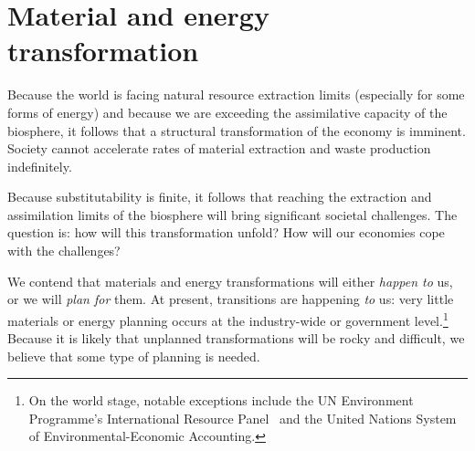 \section{Material and energy transformation}

Because the world is facing natural resource extraction limits
(especially for some forms of energy)
and because we are exceeding the assimilative capacity of the biosphere,
it follows that a structural transformation of the economy is imminent.
Society cannot accelerate rates of material extraction
and waste production indefinitely.

Because substitutability is finite, 
it follows that reaching the extraction and assimilation limits 
of the biosphere will bring significant societal challenges.
The question is: how will this transformation unfold?
How will our economies cope with the challenges?

We contend that materials and energy transformations will either  
\emph{happen to} us, or we will \emph{plan for} them.
At present,
transitions are happening \emph{to} us:
very little materials or energy planning occurs
at the industry-wide or government level.\footnote{On the world stage, 
	notable exceptions include the UN Environment Programme's 
	International Resource Panel~\cite{UNEP-IRP:aa}
	and the United Nations System of Environmental-Economic Accounting.\cite{UNSEEA:aa}
	}
Because it is likely that unplanned transformations will be rocky and difficult,
we believe that some type of planning is needed.

